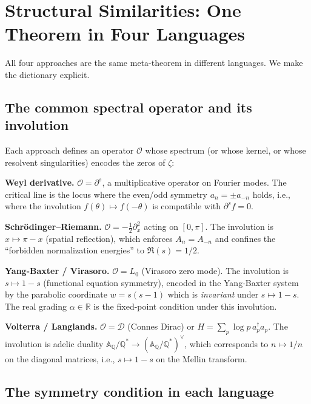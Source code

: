 \documentclass[%
 aip,
 amsmath,amssymb,
 reprint,%
]{revtex4-1}
\theoremstyle{plain}
\theoremstyle{definition}
\newcommand{\R}{\mathbb{R}}
\newcommand{\Q}{\mathbb{Q}}
\newcommand{\A}{\mathbb{A}}
\begin{document}
\section{Structural Similarities: One Theorem in Four Languages}
\label{sec:similarities}

All four approaches are the same meta-theorem in different languages.
We make the dictionary explicit.

\subsection{The common spectral operator and its involution}

Each approach defines an operator $\mathcal{O}$ whose spectrum (or whose kernel,
or whose resolvent singularities) encodes the zeros of $\zeta$:

\noindent
\textbf{Weyl derivative.} $\mathcal{O} = \partial^s$, a multiplicative operator
on Fourier modes. The critical line is the locus where the even/odd symmetry
$a_n = \pm a_{-n}$ holds, i.e., where the involution $f(\theta) \mapsto
f(-\theta)$ is compatible with $\partial^s f = 0$.

\noindent
\textbf{Schr\"odinger--Riemann.} $\mathcal{O} = -\tfrac12\partial_x^2$ acting on
$[0,\pi]$. The involution is $x \mapsto \pi - x$ (spatial reflection), which
enforces $A_n = A_{-n}$ and confines the ``forbidden normalization energies'' to
$\Re(s) = 1/2$.

\noindent
\textbf{Yang-Baxter / Virasoro.} $\mathcal{O} = L_0$ (Virasoro zero mode). The
involution is $s \mapsto 1-s$ (functional equation symmetry), encoded in the
Yang-Baxter system by the parabolic coordinate $w = s(s-1)$ which is
\emph{invariant} under $s \mapsto 1-s$. The real grading $\alpha \in \R$ is
the fixed-point condition under this involution.

\noindent
\textbf{Volterra / Langlands.} $\mathcal{O} = \mathcal{D}$ (Connes Dirac) or
$H = \sum_p \log p\,a_p^\dagger a_p$. The involution is adelic duality
$\A_\Q/\Q^* \to (\A_\Q/\Q^*)^\vee$, which corresponds to $n \mapsto 1/n$ on
the diagonal matrices, i.e., $s \mapsto 1-s$ on the Mellin transform.

\subsection{The symmetry condition in each language}
\end{document}
